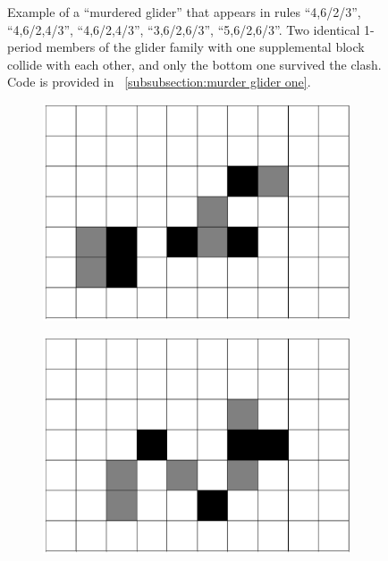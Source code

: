 \documentclass[12pt]{article}
\numberwithin{figure}{section} %
\begin{document}
\begin{figure}[H]
\begin{subfigure}{0.23\textwidth}
     	\subcaption{}
   	\end{subfigure}
   \caption[Example of a "murdered glider"]{Example of a “murdered glider” that appears in rules “4,6/2/3”, “4,6/2,4/3”, “4,6/2,4/3”, “3,6/2,6/3”, “5,6/2,6/3”. Two identical 1-period members of the glider family with one supplemental block collide with each other, and only the bottom one survived the clash. Code is provided in ~\ref{subsubsection:murder glider one}. }
   \label{fig:murder glider one}
\end{figure}

\begin{figure}[htbp]
	\begin{subfigure}{0.23\textwidth}
     	\centering
     	\includegraphics[width=\linewidth]{Section4/33.0}
     	\subcaption{}
   	\end{subfigure}
    	\begin{subfigure}{0.23\textwidth}
     	\centering
     	\includegraphics[width=\linewidth]{Section4/33.1}

\end{subfigure}
\end{figure}
\end{document}
